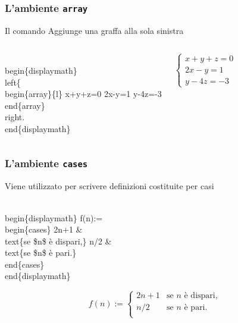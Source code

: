 \documentclass[svgnames,%
	ucs,%
	pdftex]{guitbeamer}
\begin{document}
\begin{frame}
  \frametitle{L'ambiente \texttt{array}}
	Il comando  Aggiunge una graffa alla sola sinistra
  \begin{columns}
	\begin{LaTeXcode}
		\\begin\{displaymath\} \n
		\alert{\\left\bs\{} \n
		\\begin\{array\}\{l\} \n
		\hspace*{5ex} x+y+z=0\bs\bs \n
		\hspace*{5ex} 2x-y=1\bs\bs \n
		\hspace*{5ex} y-4z=-3 \n
		\\end\{array\} \n
		\alert{\\right.} \n
		\\end\{displaymath\} 
	\end{LaTeXcode}
	\begin{LaTeXoutput}
		\vspace{5.6ex}
		\begin{displaymath} 
		\left\{
		\begin{array}{l}
		x+y+z=0\\
		2x-y=1\\
		y-4z=-3 
		\end{array} 
		\right. 
		\end{displaymath} 
		\vspace{5.6ex}
	\end{LaTeXoutput}
  \end{columns}
\end{frame}
\begin{frame}
  \frametitle{L'ambiente \texttt{cases}}
	Viene utilizzato per scrivere definizioni costituite per casi
	\begin{LaTeXcode}
		\\begin\{displaymath\}\n
		f(n):=\n
		\alert{\\begin\{cases\}} \n
		\hspace*{5ex} 2n+1 \& \\text\{se \$n\$ \`e dispari,\}\bs\bs\n
		\hspace*{5ex} n/2  \& \\text\{se \$n\$ \`e pari.\}\bs\bs\n
		\alert{\\end\{cases\}} \n
		\\end\{displaymath\}
	\end{LaTeXcode}
	\begin{LaTeXoutput}
		\begin{displaymath}
		f(n):=
		\begin{cases} 
		2n+1 & \text{se $n$ \`e dispari,}\/2  & \text{se $n$ \`e pari.} \\
		\end{cases}
		\end{displaymath}
	\end{LaTeXoutput}
\end{frame}
\end{document}
